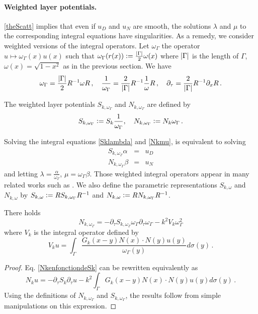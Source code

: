 \documentclass[a4paper]{article}
\begin{document}
\paragraph{Weighted layer potentials.} \autoref{theScatt} implies that even if $u_D$ and $u_N$ are smooth, the solutions $\lambda$ and $\mu$ to the corresponding integral equations have singularities. As a remedy, we consider weighted versions of the integral operators. Let $\omega_\Gamma$ the operator $u \mapsto \omega_\Gamma(x) u(x)$ such that $\omega_\Gamma(r(x)) \mathrel{\mathop:}= \frac{\left\lvert \Gamma \right\rvert}{2}\omega(x)$ where $\left\lvert \Gamma \right\rvert$ is the length of $\Gamma$, $\omega(x) = \sqrt{1 - x^2}$ as in the previous section. We have
\begin{equation}
	\omega_\Gamma = \frac{\left\lvert \Gamma \right\rvert}{2}R^{-1} \omega R\,, \quad \frac{1}{\omega_\Gamma} = \frac{2}{\left\lvert \Gamma \right\rvert}R^{-1} \frac{1}{\omega} R\,, \quad \partial_\tau = \frac{2}{\left\lvert \Gamma \right\rvert} R^{-1}\partial_x R\,.
	\label{param}
\end{equation}
\begin{Def}
	The weighted layer potentials $S_{k,\omega_\Gamma}$ and $N_{k,\omega_\Gamma}$ are defined by
	\[S_{k,\omega_\Gamma} \mathrel{\mathop:}= S_k \frac{1}{\omega_\Gamma}, \quad N_{k,\omega_\Gamma} \mathrel{\mathop:}=  N_{k}\omega_\Gamma\,.\]
\end{Def}
\noindent Solving the integral equations \eqref{Sklambda} and \eqref{Nkmu}, is equivalent to solving
\begin{eqnarray*}
	S_{k,\omega_\Gamma} \alpha &=& u_D\\
	N_{k,\omega_\Gamma} \beta &=& u_N
\end{eqnarray*}
and letting $\lambda = \frac{\alpha}{\omega_\Gamma}$, $\mu = \omega_\Gamma \beta$. Those weighted integral operators appear in many related works such as \cite{bruno2012second,jerez2012explicit,jiang2004second}. 
We also define the parametric representations $S_{k,\omega}$ and $N_{k,\omega}$ by $S_{k,\omega} \mathrel{\mathop:}= R S_{k,\omega_\Gamma}R^{-1}$ and $N_{k,\omega} \mathrel{\mathop:}= R N_{k,\omega_\Gamma} R^{-1}$. 
\begin{Lem}
	\label{NkomegaSkomega}
	There holds 
	\[N_{k,\omega_\Gamma} = -\partial_\tau S_{k,\omega_\Gamma} \omega_\Gamma \partial_\tau \omega_\Gamma - k^2 V_k \omega_\Gamma^2\]
	where $V_k$ is the integral operator defined by 
	\[V_k u = \int_{\Gamma} \frac{G_k(x - y) N(x) \cdot N(y) u(y)}{\omega_\Gamma(y)} d\sigma(y)\,. \]
\end{Lem}
\begin{proof}
	Eq. \eqref{NkenfonctiondeSk} can be rewritten equivalently as 
	\[N_k u = -\partial_\tau S_k \partial_\tau u - k^2 \int_{\Gamma} G_k(x - y) N(x) \cdot N(y) u(y) d\sigma(y)\,. \]
	Using the definitions of $N_{k,\omega_\Gamma}$ and $S_{k,\omega_\Gamma}$, the results follow from simple manipulations on this expression. 
\end{proof}
\end{document}
